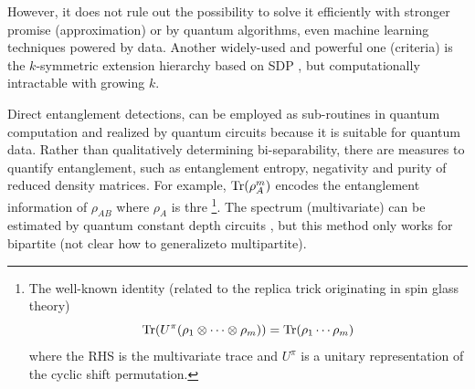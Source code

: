 \documentclass[
reprint,
aps,
pra,
floatfix,
]{revtex4-2}
\theoremstyle{plain}
\theoremstyle{definition}
\newcommand{\dm}{\rho}
\newcommand{\U}{U}
\begin{document}
However, it does not rule out the possibility to solve it efficiently with stronger promise (approximation) or by quantum algorithms, even machine learning techniques powered by data.
Another widely-used and powerful one (criteria) is the $k$-symmetric extension hierarchy based on SDP \cite{navascuesPowerSymmetricExtensions2009}, 
but computationally intractable with growing $k$.


Direct entanglement detections, can be employed as sub-routines in quantum computation and realized by quantum circuits because it is suitable for quantum data.
Rather than qualitatively determining bi-separability, there are measures to quantify entanglement, such as entanglement entropy, negativity and purity of reduced density matrices.
For example, $\Tr(\dm_A^m)$ encodes the entanglement information of $\dm_{AB}$ where $\dm_A$ is thre  \cite{ekertDirectEstimationsLinear2002} \cite{horodeckiDirectDetectionQuantum2002}
\footnote{
	The well-known identity (related to the replica trick originating in spin glass theory)
	\begin{equation}
		\Tr(\U^{\pi} (\dm_1 \otimes \cdots \otimes \dm_m) ) = 
		\Tr(\dm_1\cdots \dm_m)
	\end{equation}
	where the RHS is the multivariate trace and $\U^{\pi}$ is a unitary representation of the cyclic shift permutation.
}.
The spectrum (multivariate) can be estimated by quantum constant depth circuits \cite{johriEntanglementSpectroscopyQuantum2017}  \cite{quekMultivariateTraceEstimation2022}, but this method only works for bipartite (not clear how to generalizeto multipartite).
\end{document}
